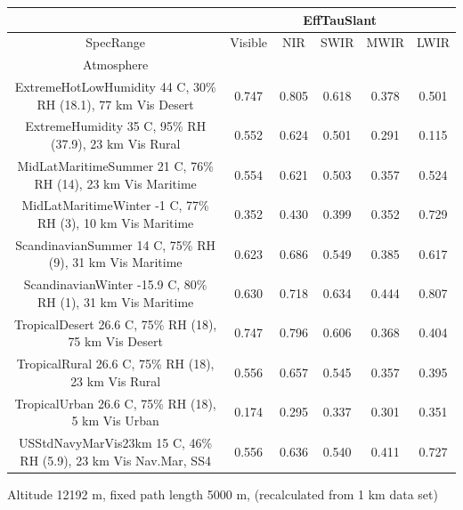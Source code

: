 \documentclass{workpackage}
\begin{document}
\begin{center}

\begin{footnotesize}

\begin{tabular}{|c|c|c|c|c|c|}
\hline
&\multicolumn{5}{|c|}{EffTauSlant}\\\hline
SpecRange&Visible&NIR&SWIR&MWIR&LWIR\\\hline
Atmosphere&&&&&\\\hline
ExtremeHotLowHumidity 44 C, 30\% RH (18.1), 77 km Vis Desert&0.747&0.805&0.618&0.378&0.501\\\hline
ExtremeHumidity 35 C, 95\% RH (37.9), 23 km Vis Rural&0.552&0.624&0.501&0.291&0.115\\\hline
MidLatMaritimeSummer 21 C, 76\% RH (14), 23 km Vis Maritime&0.554&0.621&0.503&0.357&0.524\\\hline
MidLatMaritimeWinter -1 C, 77\% RH (3), 10 km Vis Maritime&0.352&0.430&0.399&0.352&0.729\\\hline
ScandinavianSummer 14 C, 75\% RH (9), 31 km Vis Maritime&0.623&0.686&0.549&0.385&0.617\\\hline
ScandinavianWinter -15.9 C, 80\% RH (1), 31 km Vis Maritime&0.630&0.718&0.634&0.444&0.807\\\hline
TropicalDesert 26.6 C, 75\% RH (18), 75 km Vis Desert&0.747&0.796&0.606&0.368&0.404\\\hline
TropicalRural 26.6 C, 75\% RH (18), 23 km Vis Rural&0.556&0.657&0.545&0.357&0.395\\\hline
TropicalUrban 26.6 C, 75\% RH (18), 5 km Vis Urban&0.174&0.295&0.337&0.301&0.351\\\hline
USStdNavyMarVis23km 15 C, 46\% RH (5.9), 23 km Vis Nav.Mar, SS4&0.556&0.636&0.540&0.411&0.727\\\hline

\end{tabular}
\end{footnotesize}
\end{center}

Altitude 12192 m, fixed path length 5000 m, (recalculated from 1 km data set)
\end{document}
